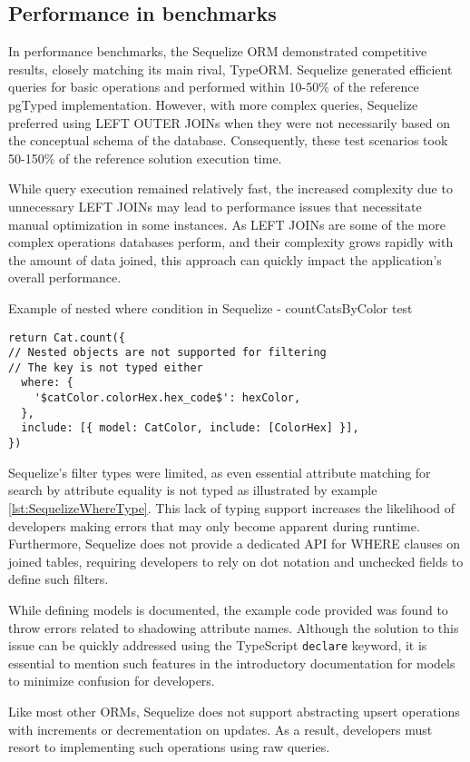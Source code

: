 \subsection*{Performance in benchmarks}

In performance benchmarks, the Sequelize ORM demonstrated competitive results,
closely matching its main rival, TypeORM. Sequelize generated efficient queries
for basic operations and performed within 10-50\% of the reference pgTyped
implementation. However, with more complex queries, Sequelize preferred using
LEFT OUTER JOINs when they were not necessarily based on the conceptual schema
of the database. Consequently, these test scenarios took 50-150\% of the
reference solution execution time.

While query execution remained relatively fast, the increased complexity due to
unnecessary LEFT JOINs may lead to performance issues that necessitate manual
optimization in some instances. As LEFT JOINs are some of the more complex
operations databases perform, and their complexity grows rapidly with the amount
of data joined, this approach can quickly impact the application's overall
performance.

\begin{listing}
    \caption{Example of nested where condition in Sequelize - countCatsByColor test}
    \label{lst:SequelizeWhereType}
\begin{verbatim}
return Cat.count({
// Nested objects are not supported for filtering
// The key is not typed either
  where: {
    '$catColor.colorHex.hex_code$': hexColor,
  },
  include: [{ model: CatColor, include: [ColorHex] }],
})
    \end{verbatim}
\end{listing}

Sequelize's filter types were limited, as even essential attribute matching for
search by attribute equality is not typed as illustrated by example
\autoref{lst:SequelizeWhereType}. This lack of typing support increases the
likelihood of developers making errors that may only become apparent during
runtime. Furthermore, Sequelize does not provide a dedicated API for WHERE
clauses on joined tables, requiring developers to rely on dot notation and
unchecked fields to define such filters.

While defining models is documented, the example code provided was found to
throw errors related to shadowing attribute names. Although the solution to this
issue can be quickly addressed using the TypeScript \texttt{declare} keyword, it is
essential to mention such features in the introductory documentation for models
to minimize confusion for developers.

Like most other ORMs, Sequelize does not support abstracting upsert operations
with increments or decrementation on updates. As a result, developers must
resort to implementing such operations using raw queries.